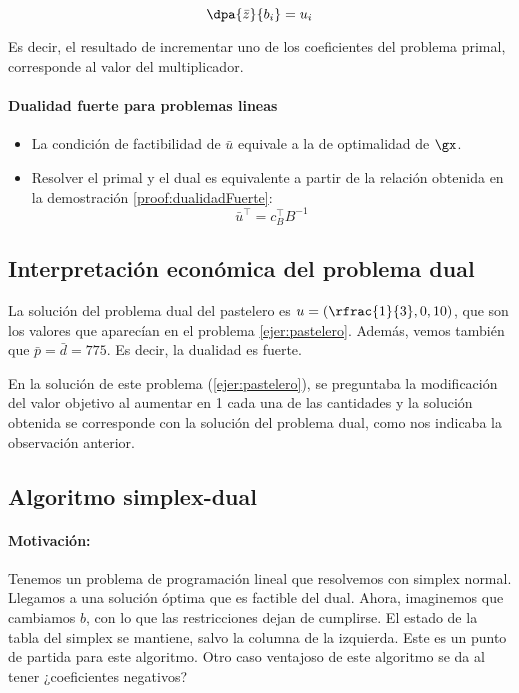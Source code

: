 \obs
\[
\dpa{\bar{z}}{b_i} = u_i
\]

Es decir, el resultado de incrementar uno de los coeficientes del problema primal, corresponde al valor del multiplicador.

\paragraph{Dualidad fuerte para problemas lineas}
\begin{itemize}
	\item La condición de factibilidad de $\bar{u}$ equivale a la de optimalidad de $\gx$.
	\item Resolver el primal y el dual es equivalente a partir de la relación obtenida en la demostración \ref{proof:dualidadFuerte}:
	\[
		\bar{u}^\top =  c_B^\top B^{-1}
	\]
\end{itemize}

\subsection{Interpretación económica del problema dual}

La solución del problema dual del pastelero es $u = \left(\rfrac{1}{3},0,10\right)$, que son los valores que aparecían en el problema \ref{ejer:pastelero}. Además, vemos también que $\bar{p} = \bar{d} = 775$. Es decir, la dualidad es fuerte. 


En la solución de este problema (\ref{ejer:pastelero}), se preguntaba la modificación del valor objetivo al aumentar en 1 cada una de las cantidades y la solución obtenida se corresponde con la solución del problema dual,
como nos indicaba la observación anterior.


\subsection{Algoritmo simplex-dual}

\paragraph{Motivación:} 
Tenemos un problema de programación lineal que resolvemos con simplex normal. 
Llegamos a una solución óptima que es factible del dual. Ahora, imaginemos que cambiamos $b$, con lo que las restricciones dejan de cumplirse. El estado de la tabla del simplex se mantiene, salvo la columna de la izquierda. 
Este es un punto de partida para este algoritmo. Otro caso ventajoso de este algoritmo se da al tener ¿coeficientes negativos?





